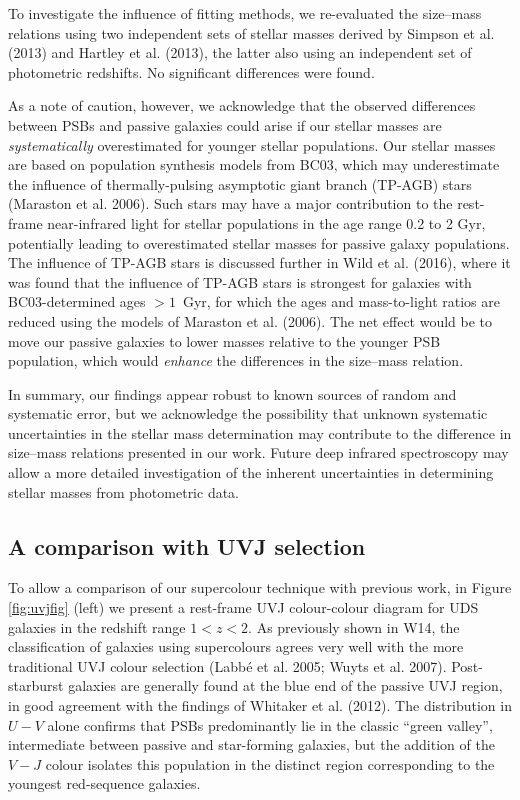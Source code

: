 \documentclass[a4paper,fleqn,usenatbib,useAMS]{mnras}
\begin{document}
To investigate the influence of fitting methods, we re-evaluated the
size--mass relations using two independent sets of stellar masses
derived by Simpson et al. (2013) and Hartley et al. (2013), the latter
also using an independent set of photometric redshifts.  No
significant differences were found. 

As a note of caution, however, we acknowledge that the observed
differences between PSBs and passive galaxies could arise if our
stellar masses are {\em systematically} overestimated for younger
stellar populations. Our stellar masses are based on population
synthesis models from BC03, which may underestimate the influence of
thermally-pulsing asymptotic giant branch (TP-AGB) stars (Maraston et
al. 2006). Such stars may have a major contribution to the rest-frame
near-infrared light for stellar populations in the age range 0.2 to 2
Gyr, potentially leading to overestimated stellar masses for passive
galaxy populations.  The influence of TP-AGB stars is discussed
further in Wild et al. (2016), where it was found that the influence
of TP-AGB stars is strongest for galaxies with BC03-determined ages
$>1$~Gyr, for which the ages and mass-to-light ratios are reduced
using the models of Maraston et al. (2006). The net effect would be
to move our passive galaxies to lower masses relative to the younger
PSB population, which would {\em enhance} the differences in the
size--mass relation.

In summary, our findings appear robust to known sources of random and
systematic error, but we acknowledge the possibility that unknown
systematic uncertainties in the stellar mass determination may
contribute to the difference in size--mass relations presented in our
work. Future deep infrared spectroscopy may allow a more detailed
investigation of the inherent uncertainties in determining stellar
masses from photometric data.









\subsection{A comparison with UVJ selection}
\label{sec:uvj}



To allow a comparison of our supercolour technique with previous work,
in Figure \ref{fig:uvjfig} (left) we present a rest-frame UVJ
colour-colour diagram for UDS galaxies in the redshift range
$1<z<2$. As previously shown in W14, the classification of galaxies
using supercolours agrees very well with the more traditional UVJ
colour selection (Labb\'e et al. 2005; Wuyts et
al. 2007). Post-starburst galaxies are generally found at the blue end
of the passive UVJ region, in good agreement with the findings of
Whitaker et al. (2012). The distribution in $U-V$ alone confirms that
PSBs predominantly lie in the classic ``green valley'', intermediate
between passive and star-forming galaxies, but the addition of the
$V-J$ colour isolates this population in the distinct region
corresponding to the youngest red-sequence galaxies.
\end{document}
